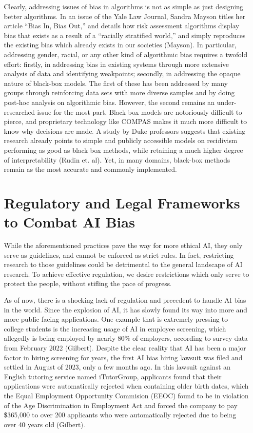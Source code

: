 \documentclass[10pt]{article}
\begin{document}
  Clearly, addressing issues of bias in algorithms is not as simple as just designing better algorithms. In an issue of the Yale Law Journal, Sandra Mayson titles her article “Bias In, Bias Out,” and details how risk assessment algorithms display bias that exists as a result of a “racially stratified world,” and simply reproduces the existing bias which already exists in our societies (Mayson). In particular, addressing gender, racial, or any other kind of algorithmic bias requires a twofold effort: firstly, in addressing bias in existing systems through more extensive analysis of data and identifying weakpoints; secondly, in addressing the opaque nature of black-box models. The first of these has been addressed by many groups through reinforcing data sets with more diverse samples and by doing post-hoc analysis on algorithmic bias. However, the second remains an under-researched issue for the most part. Black-box models are notoriously difficult to pierce, and proprietary technology like COMPAS makes it much more difficult to know why decisions are made. A study by Duke professors suggests that existing research already points to simple and publicly accessible models on recidivism performing as good as black box methods, while retaining a much higher degree of interpretability (Rudin et. al). Yet, in many domains, black-box methods remain as the most accurate and commonly implemented. 

\section{Regulatory and Legal Frameworks to Combat AI Bias}

  While the aforementioned practices pave the way for more ethical AI, they only serve as guidelines, and cannot be enforced as strict rules. In fact, restricting research to those guidelines could be detrimental to the general landscape of AI research. To achieve effective regulation, we desire restrictions which only serve to protect the people, without stifling the pace of progress.

  As of now, there is a shocking lack of regulation and precedent to handle AI bias in the world. Since the explosion of AI, it has slowly found its way into more and more public-facing applications. One example that is extremely pressing to college students is the increasing usage of AI in employee screening, which allegedly is being employed by nearly 80\% of employers, according to survey data from February 2022 (Gilbert). Despite the clear reality that AI has been a major factor in hiring screening for years, the first AI bias hiring lawsuit was filed and settled in August of 2023, only a few months ago. In this lawsuit against an English tutoring service named iTutorGroup, applicants found that their applications were automatically rejected when containing older birth dates, which the Equal Employment Opportunity Commision (EEOC) found to be in violation of the Age Discrimination in Employment Act and forced the company to pay \$365,000 to over 200 applicants who were automatically rejected due to being over 40 years old (Gilbert).
\end{document}
